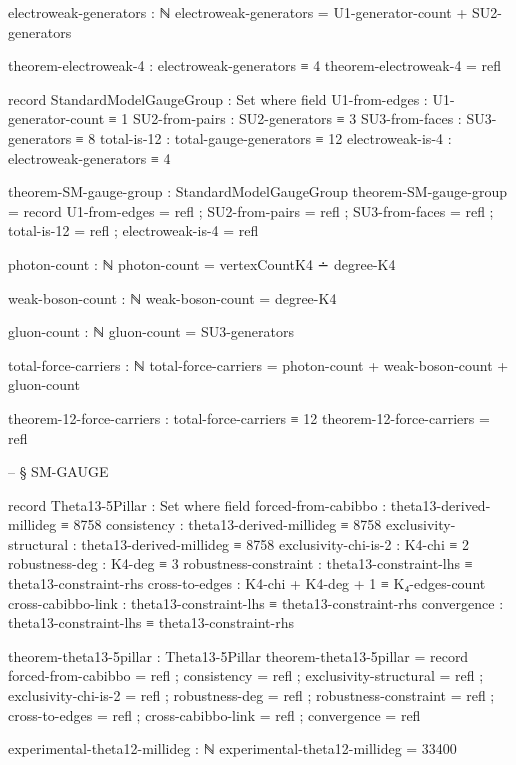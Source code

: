 \documentclass[11pt,a4paper]{book}
\begin{document}
\begin{code}
electroweak-generators : ℕ
electroweak-generators = U1-generator-count + SU2-generators

theorem-electroweak-4 : electroweak-generators ≡ 4
theorem-electroweak-4 = refl

record StandardModelGaugeGroup : Set where
  field
    U1-from-edges    : U1-generator-count ≡ 1
    SU2-from-pairs   : SU2-generators ≡ 3
    SU3-from-faces   : SU3-generators ≡ 8
    total-is-12      : total-gauge-generators ≡ 12
    electroweak-is-4 : electroweak-generators ≡ 4

theorem-SM-gauge-group : StandardModelGaugeGroup
theorem-SM-gauge-group = record
  { U1-from-edges    = refl
  ; SU2-from-pairs   = refl
  ; SU3-from-faces   = refl
  ; total-is-12      = refl
  ; electroweak-is-4 = refl
  }

photon-count : ℕ
photon-count = vertexCountK4 ∸ degree-K4

weak-boson-count : ℕ
weak-boson-count = degree-K4

gluon-count : ℕ
gluon-count = SU3-generators

total-force-carriers : ℕ
total-force-carriers = photon-count + weak-boson-count + gluon-count

theorem-12-force-carriers : total-force-carriers ≡ 12
theorem-12-force-carriers = refl


-- § SM-GAUGE

record Theta13-5Pillar : Set where
  field
    forced-from-cabibbo    : theta13-derived-millideg ≡ 8758
    consistency            : theta13-derived-millideg ≡ 8758
    exclusivity-structural : theta13-derived-millideg ≡ 8758
    exclusivity-chi-is-2   : K4-chi ≡ 2
    robustness-deg         : K4-deg ≡ 3
    robustness-constraint  : theta13-constraint-lhs ≡ theta13-constraint-rhs
    cross-to-edges         : K4-chi + K4-deg + 1 ≡ K₄-edges-count
    cross-cabibbo-link     : theta13-constraint-lhs ≡ theta13-constraint-rhs
    convergence            : theta13-constraint-lhs ≡ theta13-constraint-rhs

theorem-theta13-5pillar : Theta13-5Pillar
theorem-theta13-5pillar = record
  { forced-from-cabibbo    = refl
  ; consistency            = refl
  ; exclusivity-structural = refl
  ; exclusivity-chi-is-2   = refl
  ; robustness-deg         = refl
  ; robustness-constraint  = refl
  ; cross-to-edges         = refl
  ; cross-cabibbo-link     = refl
  ; convergence            = refl
  }

experimental-theta12-millideg : ℕ
experimental-theta12-millideg = 33400


\end{code}
\end{document}
